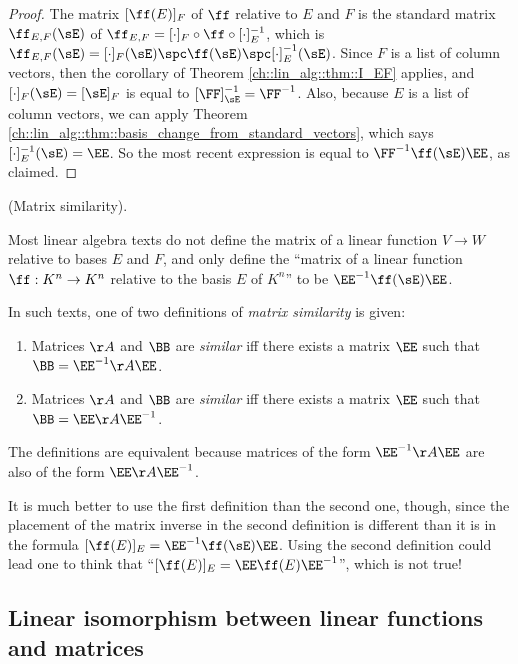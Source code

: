 \begin{proof}
   The matrix $[\ff(E)]_F$ of $\ff$ relative to $E$ and $F$ is the standard matrix $\ff_{E,F}(\sE)$ of $\ff_{E,F} = [\cdot]_F \circ \ff \circ [\cdot]_E^{-1}$, which is $\ff_{E,F}(\sE) = [\cdot]_F(\sE) \spc \ff(\sE) \spc [\cdot]_E^{-1}(\sE)$. Since $F$ is a list of column vectors, then the corollary of Theorem \ref{ch::lin_alg::thm::I_EF} applies, and $[\cdot]_F(\sE) = [\sE]_F$ is equal to $[\FF]_\sE^{-1} = \FF^{-1}$. Also, because $E$ is a list of column vectors, we can apply Theorem \ref{ch::lin_alg::thm::basis_change_from_standard_vectors}, which says $[\cdot]_E^{-1}(\sE) = \EE$. So the most recent expression is equal to $\FF^{-1} \ff(\sE) \EE$, as claimed.
\end{proof}

\begin{remark}
    (Matrix similarity).

    Most linear algebra texts do not define the matrix of a linear function $V \rightarrow W$ relative to bases $E$ and $F$, and only define the ``matrix of a linear function $\ff:K^n \rightarrow K^n$ relative to the basis $E$ of $K^n$'' to be $\EE^{-1} \ff(\sE) \EE$.

    In such texts, one of two definitions of \textit{matrix similarity} is given:

    \begin{enumerate}
        \item Matrices $\AA$ and $\BB$ are \textit{similar} iff there exists a matrix $\EE$ such that $\BB = \EE^{-1} \AA \EE$.
        \item Matrices $\AA$ and $\BB$ are \textit{similar} iff there exists a matrix $\EE$ such that $\BB = \EE \AA \EE^{-1}$.
    \end{enumerate}
    
    The definitions are equivalent because matrices of the form $\EE^{-1} \AA \EE$ are also of the form $\EE \AA \EE^{-1}$.
    
    It is much better to use the first definition than the second one, though, since the placement of the matrix inverse in the second definition is different than it is in the formula $[\ff(E)]_E = \EE^{-1} \ff(\sE) \EE$. Using the second definition could lead one to think that ``$[\ff(E)]_E = \EE \ff(E) \EE^{-1}$'', which is not true!
\end{remark}

\newpage

\subsection*{Linear isomorphism between linear functions and matrices}

